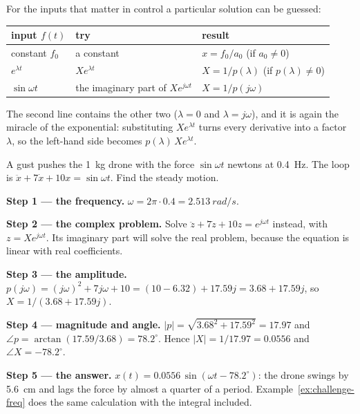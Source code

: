 For the inputs that matter in control a particular solution can be guessed:
\begin{center}\small
\renewcommand{\arraystretch}{1.3}
\begin{tabular}{@{}lll@{}}
\toprule
input $f(t)$ & try & result\\
\midrule
constant $f_0$ & a constant & $x = f_0/a_0$ \quad (if $a_0 \ne 0$)\\
$e^{\lambda t}$ & $X e^{\lambda t}$ & $X = 1/p(\lambda)$ \quad (if $p(\lambda) \ne 0$)\\
$\sin\omega t$ & the imaginary part of $X e^{j\omega t}$ & $X = 1/p(j\omega)$\\
\bottomrule
\end{tabular}
\end{center}
The second line contains the other two ($\lambda = 0$ and $\lambda = j\omega$), and it is again the miracle of the exponential: substituting $X e^{\lambda t}$ turns every derivative into a factor $\lambda$, so the left-hand side becomes $p(\lambda)\,X e^{\lambda t}$.

\begin{example}
\label{ex:A-forced}
A gust pushes the \SI{1}{kg} drone with the force $\sin\omega t$ newtons at \SI{0.4}{Hz}. The loop is $\ddot x + 7\dot x + 10x = \sin\omega t$. Find the steady motion.

\textbf{Step 1 — the frequency.} $\omega = 2\pi \cdot 0.4 = \SI{2.513}{rad/s}$.

\textbf{Step 2 — the complex problem.} Solve $\ddot z + 7\dot z + 10 z = e^{j\omega t}$ instead, with $z = X e^{j\omega t}$. Its imaginary part will solve the real problem, because the equation is linear with real coefficients.

\textbf{Step 3 — the amplitude.} $p(j\omega) = (j\omega)^2 + 7j\omega + 10 = (10 - 6.32) + 17.59j = 3.68 + 17.59j$, so $X = 1/(3.68 + 17.59j)$.

\textbf{Step 4 — magnitude and angle.} $|p| = \sqrt{3.68^2 + 17.59^2} = 17.97$ and $\angle p = \arctan(17.59/3.68) = 78.2^\circ$. Hence $|X| = 1/17.97 = 0.0556$ and $\angle X = -78.2^\circ$.

\textbf{Step 5 — the answer.} $x(t) = 0.0556\,\sin(\omega t - 78.2^\circ)$: the drone swings by \SI{5.6}{cm} and lags the force by almost a quarter of a period. Example~\ref{ex:challenge-freq} does the same calculation with the integral included.
\end{example}


